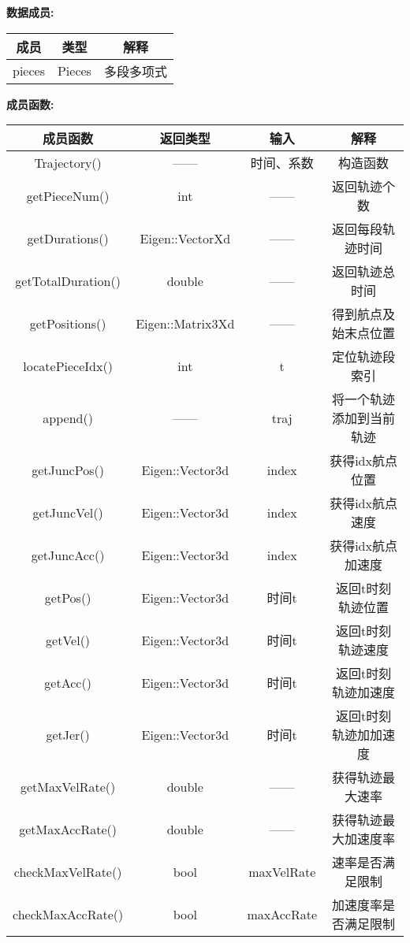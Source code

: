 \begin{tcolorbox}[red]
    \textbf{数据成员:}\\
    \begin{tabular}{ccc}
        \toprule
        成员 & 类型  & 解释  \\
        \midrule
        pieces & Pieces & 多段多项式 \\
        \bottomrule
    \end{tabular}
\end{tcolorbox}


\begin{tcolorbox}[red]
    \textbf{成员函数:}\\
    \begin{tabular}{cccc}
        \toprule
        成员函数 & 返回类型 & 输入 & 解释  \\
        \midrule
        Trajectory() & —— & 时间、系数 & 构造函数\\
        getPieceNum() & int & —— & 返回轨迹个数\\
        getDurations() & Eigen::VectorXd & —— & 返回每段轨迹时间\\
        getTotalDuration() & double & —— & 返回轨迹总时间 \\
        getPositions()  &  Eigen::Matrix3Xd  & —— & 得到航点及始末点位置  \\
        locatePieceIdx() & int &  t & 定位轨迹段索引\\
        append()& —— &traj &将一个轨迹添加到当前轨迹\\
        getJuncPos() & Eigen::Vector3d & index & 获得idx航点位置\\
        getJuncVel() & Eigen::Vector3d & index & 获得idx航点速度\\
        getJuncAcc() & Eigen::Vector3d & index & 获得idx航点加速度\\
        getPos() &  Eigen::Vector3d  & 时间t & 返回t时刻轨迹位置  \\
        getVel() &  Eigen::Vector3d  & 时间t & 返回t时刻轨迹速度  \\
        getAcc() &  Eigen::Vector3d  & 时间t & 返回t时刻轨迹加速度  \\
        getJer() &  Eigen::Vector3d  & 时间t & 返回t时刻轨迹加加速度  \\
        getMaxVelRate() & double & —— & 获得轨迹最大速率\\
        getMaxAccRate() & double & —— & 获得轨迹最大加速度率\\
        checkMaxVelRate() & bool & maxVelRate & 速率是否满足限制\\
        checkMaxAccRate() & bool & maxAccRate & 加速度率是否满足限制\\
        \bottomrule
    \end{tabular}
\end{tcolorbox}
